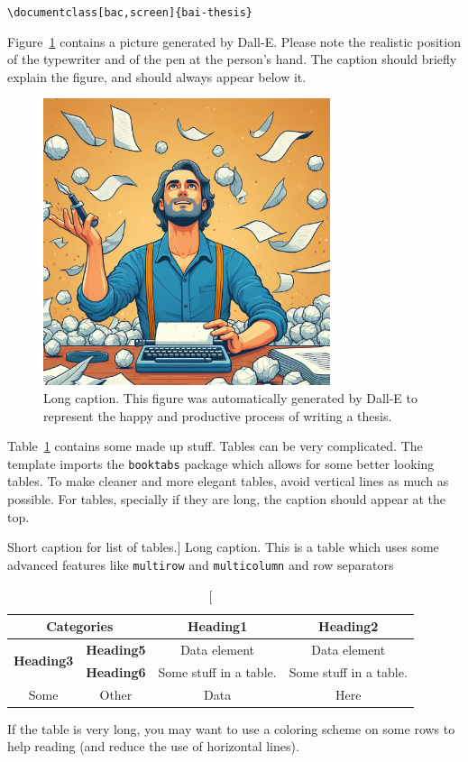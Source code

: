 \verb|\documentclass[bac,screen]{bai-thesis}| \\
\begin{document}
Figure~\ref{fig:exa} contains a picture generated by Dall-E. Please note the realistic position of the typewriter and of the pen at the person's hand. The caption should briefly explain the figure, and should always appear below it.  
%
\begin{figure}[tb]
\centering
\includegraphics[width=0.75\textwidth]{figures/typewriter} 
\caption[Short caption for list of figures]{Long caption. This figure was automatically generated by Dall-E to represent the happy and productive process of writing a thesis.}
\label{fig:exa}
\end{figure}

Table~\ref{tab:exa} contains some made up stuff. Tables can be
very complicated. The template imports the \texttt{booktabs} package
which allows for some better looking tables. To make cleaner and more
elegant tables, avoid vertical lines as much as possible. For tables,
specially if they are long, the caption should appear at the top.
%
\begin{table}[tb]
\centering
\caption
[Short caption for list of tables.]
{Long caption.  This is a table which uses some advanced features like
\texttt{multirow} and \texttt{multicolumn} and row separators}
\label{tab:exa}
\begin{tabular}{cccc}
\toprule
\multicolumn{2}{c}{\textbf{Categories}} &
  \textbf{Heading1} &
  \textbf{Heading2} \\
\midrule
\multirow{2}{*}{\textbf{Heading3}} &
  \textbf{Heading5} &
      Data element
     &
      Data element
     \\
  \cmidrule{2-4}
&
  \textbf{Heading6} &
      Some stuff in a table.
     &
      Some stuff in a table.
     \\
\midrule
Some & Other & Data & Here \\
\bottomrule
\end{tabular}
\end{table}
%
If the table is very long, you may want to use a coloring scheme on
some rows to help reading (and reduce the use of horizontal lines).
\end{document}
